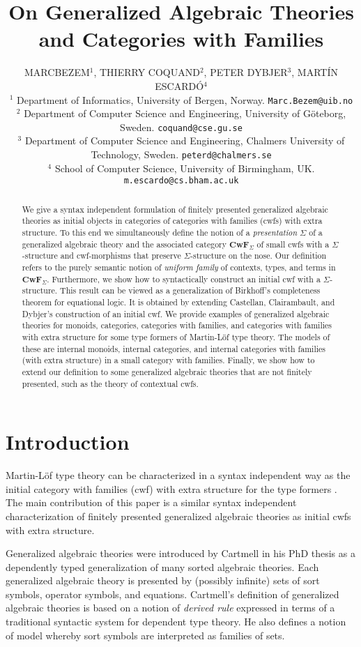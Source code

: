 \documentclass{mscs}
\title[Generalized Algebraic Theories and Categories with Families]{On Generalized Algebraic Theories\\and Categories with Families}
\author[Bezem, Coquand, Dybjer, Escard\'o]
{M\ls A\ls R\ls C\ns B\ls E\ls Z\ls E\ls  M$^1$,%
\ns T\ls H\ls I\ls E\ls R\ls R\ls Y\ns
C\ls O\ls Q\ls U\ls A\ls N\ls D$^2$,
\ns P\ls E\ls T\ls E\ls R\ns
D\ls Y\ls B\ls J\ls E\ls R$^3$,
\ns M\ls A\ls R\ls T\ls \'I\ls N\ns
E\ls S\ls C\ls A\ls R\ls D\ls \'O$^4$
\\
$^1$ Department of Informatics, 
\addressbreak University of Bergen, Norway.
\addressbreak \texttt{Marc.Bezem@uib.no}\\
$^2$ Department of Computer Science and Engineering, 
\addressbreak University of G\"oteborg, 
Sweden.
\addressbreak \texttt{coquand@cse.gu.se}\\
$^3$ Department of Computer Science and Engineering, 
\addressbreak Chalmers University of Technology, 
Sweden.
\addressbreak \texttt{peterd@chalmers.se}\\
$^4$ School of Computer Science, 
\addressbreak University of Birmingham, UK.
\addressbreak \texttt{m.escardo@cs.bham.ac.uk}
}
\newcommand{\FYI}[1]{{#1}}
\def\Cwf{\mathbf{CwF}}
\begin{document}
\maketitle
\begin{abstract}
{We give a syntax independent formulation of finitely presented generalized algebraic theories as initial objects in categories of categories with families (cwfs) with extra structure.
To this end we simultaneously define the notion of a \FYI{\em{presentation}} $\Sigma$ of a generalized algebraic theory and the associated category $\Cwf_\Sigma$ of small cwfs with a $\Sigma$-structure and cwf-morphisms that preserve $\Sigma$-structure on the nose.  Our definition refers to the purely semantic notion of {\em uniform family} of contexts, types, and terms in $\Cwf_\Sigma$. Furthermore, we show how to syntactically construct an initial cwf with a $\Sigma$-structure. This result can be viewed as a generalization of Birkhoff's completeness theorem for equational logic. It is obtained by extending Castellan, Clairambault, and Dybjer's construction of an initial cwf. We provide examples of generalized algebraic theories for monoids, categories, categories with families, and categories with families with extra structure for some type formers of Martin-Löf type theory. The models of these are internal monoids, internal categories, and internal categories with families (with extra structure) in a small category with families. Finally, we show how to extend our definition to some generalized algebraic theories that are not finitely presented, such as the theory of contextual cwfs.
}\end{abstract}

\section{Introduction}

Martin-Löf type theory can be characterized in a syntax independent way as the initial category with families (cwf)  with extra structure for the type formers \cite{castellan:tlca2015,castellan:lmcs}. The main contribution of this paper is a similar syntax independent characterization of finitely presented generalized algebraic theories as initial cwfs with extra structure.

Generalized algebraic theories were introduced by Cartmell in his PhD thesis \cite{cartmell:phd} as a dependently typed generalization of many sorted algebraic theories. Each generalized algebraic theory is presented by (possibly infinite) sets of sort symbols, operator symbols, and equations. Cartmell's definition of generalized algebraic theories \cite{cartmell:phd,cartmell:apal} is based on a notion of {\em derived rule} expressed in terms of a traditional syntactic system for dependent type theory. He also defines a notion of model whereby sort symbols are interpreted as families of sets.
\end{document}
